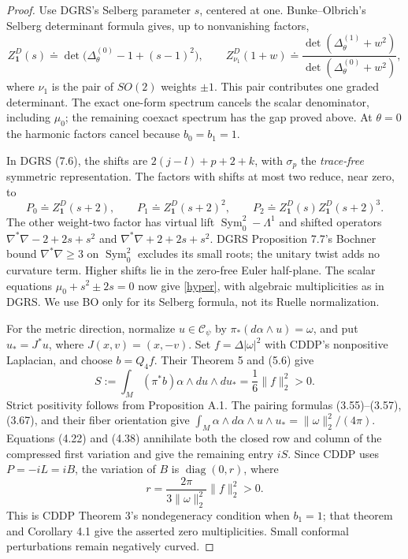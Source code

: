 \documentclass[11pt]{article}
\begin{document}
\begin{proof}
Use DGRS's Selberg parameter $s$, centered at one. Bunke--Olbrich's
Selberg determinant formula \cite[Proposition 4.7]{BO} gives, up to
nonvanishing factors,
\[
 Z^D_{\mathbf1}(s)\doteq
 \det\bigl(\Delta_\theta^{(0)}-1+(s-1)^2\bigr),\qquad
 Z^D_{\nu_1}(1+w)\doteq
 \frac{\det(\Delta_\theta^{(1)}+w^2)}
      {\det(\Delta_\theta^{(0)}+w^2)},
\]
where $\nu_1$ is the pair of $SO(2)$ weights $\pm1$. This pair
contributes one graded determinant. The exact one-form spectrum cancels
the scalar denominator, including $\mu_0$; the remaining coexact spectrum
has the gap proved above. At $\theta=0$ the harmonic factors cancel
because $b_0=b_1=1$.

In DGRS (7.6), the shifts are $2(j-l)+p+2+k$, with $\sigma_p$ the
\emph{trace-free} symmetric representation. The factors with shifts at
most two reduce, near zero, to
\[
 P_0\doteq Z^D_{\mathbf1}(s+2),\qquad
 P_1\doteq Z^D_{\mathbf1}(s+2)^2,\qquad
 P_2\doteq Z^D_{\mathbf1}(s)Z^D_{\mathbf1}(s+2)^3.
\]
The other weight-two factor has virtual lift
$\operatorname{Sym}^2_0-\Lambda^1$ and shifted operators
$\nabla^*\nabla-2+2s+s^2$ and $\nabla^*\nabla+2+2s+s^2$.
DGRS Proposition 7.7's Bochner bound $\nabla^*\nabla\ge3$ on
$\operatorname{Sym}^2_0$ excludes its small roots; the unitary twist adds
no curvature term. Higher shifts lie in the zero-free Euler half-plane.
The scalar equations $\mu_0+s^2\pm2s=0$ now give \eqref{hyper}, with
algebraic multiplicities as in DGRS. We use BO only for its Selberg
formula, not its Ruelle normalization.

For the metric direction, normalize $u\in\mathcal C_\psi$ by
$\pi_*(d\alpha\wedge u)=\omega$, and put $u_*=J^*u$, where
$J(x,v)=(x,-v)$. Set $f=\Delta|\omega|^2$ with CDDP's nonpositive
Laplacian, and choose $b=Q_4f$. Their Theorem 5 and (5.6) give
\[
 S:=\int_M(\pi^*b)\alpha\wedge du\wedge du_*
      =\frac16\|f\|_2^2>0.
\]
Strict positivity follows from Proposition A.1. The pairing formulas
(3.55)--(3.57), (3.67), and their fiber orientation give
$\int_M\alpha\wedge d\alpha\wedge u\wedge u_*=\|\omega\|_2^2/(4\pi)$.
Equations (4.22) and (4.38) annihilate both the closed row and column of
the compressed first variation and give the remaining entry $iS$.
Since CDDP uses $P=-iL=iB$, the variation of $B$ is
$\operatorname{diag}(0,r)$, where
\[
 r=\frac{2\pi}{3\|\omega\|_2^2}\|f\|_2^2>0.
\]
This is CDDP Theorem 3's nondegeneracy condition when $b_1=1$;
that theorem and Corollary 4.1 give the asserted zero multiplicities.
Small conformal perturbations remain negatively curved.
\end{proof}
\end{document}
